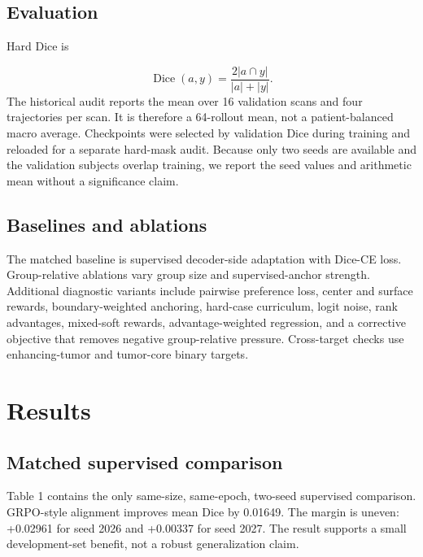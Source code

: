 \documentclass[10pt]{article}
\begin{document}
\subsection{Evaluation}
Hard Dice is

\[
\operatorname{Dice}(a,y)=\frac{2|a\cap y|}{|a|+|y|}.
\]
The historical audit reports the mean over 16 validation scans and four trajectories per scan. It is therefore a 64-rollout mean, not a patient-balanced macro average. Checkpoints were selected by validation Dice during training and reloaded for a separate hard-mask audit. Because only two seeds are available and the validation subjects overlap training, we report the seed values and arithmetic mean without a significance claim.

\subsection{Baselines and ablations}
The matched baseline is supervised decoder-side adaptation with Dice-CE loss. Group-relative ablations vary group size and supervised-anchor strength. Additional diagnostic variants include pairwise preference loss, center and surface rewards, boundary-weighted anchoring, hard-case curriculum, logit noise, rank advantages, mixed-soft rewards, advantage-weighted regression, and a corrective objective that removes negative group-relative pressure. Cross-target checks use enhancing-tumor and tumor-core binary targets.

\section{Results}
\subsection{Matched supervised comparison}
Table 1 contains the only same-size, same-epoch, two-seed supervised comparison. GRPO-style alignment improves mean Dice by 0.01649. The margin is uneven: +0.02961 for seed 2026 and +0.00337 for seed 2027. The result supports a small development-set benefit, not a robust generalization claim.

\begin{table}[t]
\centering
\small
\caption{Table 1. Retrospective RC development result. The split contains longitudinal subject overlap.}
\end{table}
\end{document}
